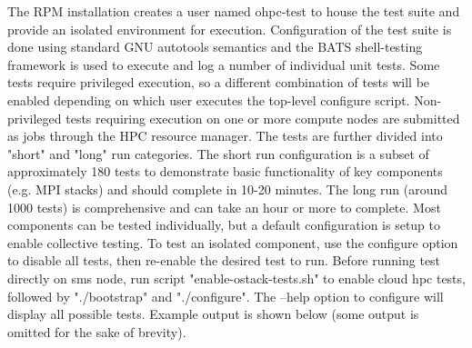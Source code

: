 The RPM installation creates a user named ohpc-test to house the test suite and provide an isolated environment for execution. Configuration of the test suite is done using standard GNU autotools semantics and the BATS shell-testing framework is used to execute and log a number of individual unit tests. Some tests require privileged execution, so a different combination of tests will be enabled depending on which user executes the top-level configure script. Non-privileged tests requiring execution on one or more compute nodes are submitted as jobs through the HPC resource manager. The tests are further divided into "short" and "long" run categories. The short run configuration is a subset of approximately 180 tests to demonstrate basic functionality of key components (e.g. MPI stacks) and should complete in 10-20 minutes. The long run (around 1000 tests) is comprehensive and can take an hour or more to complete. Most components can be tested individually, but a default configuration is setup to enable collective testing. To test an isolated component, use the configure option to disable all tests, then re-enable the desired test to run. Before running test directly on sms node, run script "enable-ostack-tests.sh" to enable cloud hpc tests, followed by "./bootstrap" and "./configure". The --help option to configure will display all possible tests. Example output is shown below (some output is omitted for the sake of brevity).

